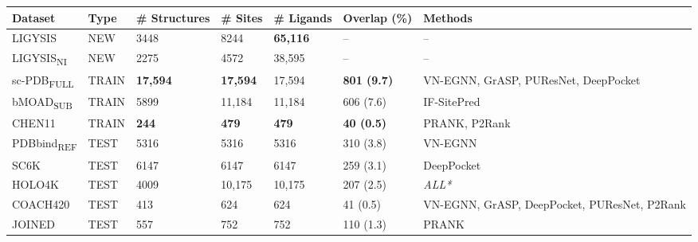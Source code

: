 \begin{landscape}
\begin{longtable}{|M{24mm}|M{20mm}|M{27mm}|M{20mm}|M{25mm}|M{25mm}|M{58mm}|}
\hline
\textbf{Dataset}    & \textbf{Type}  & \textbf{\# Structures} & \textbf{\# Sites} & \textbf{\# Ligands} & \textbf{Overlap} (\%) & \textbf{Methods}                                      \\ \hline
\endfirsthead
%
\endhead
%
LIGYSIS    & NEW   & 3448         & 8244    & \textbf{\textcolor{CBBlue}{65,116}}     & --          & --                                            \\ \hline
LIGYSIS\textsubscript{NI}  & NEW   & 2275         & 4572    & 38,595     & --          & --                                            \\ \hline
sc-PDB\textsubscript{FULL} & TRAIN & \textbf{\textcolor{CBBlue}{17,594}}        & \textbf{\textcolor{CBBlue}{17,594}}   & 17,594     & \textbf{\textcolor{CBOrange}{801 (9.7)}}        & VN-EGNN, GrASP, PUResNet, DeepPocket         \\ \hline
bMOAD\textsubscript{SUB}   & TRAIN & 5899         & 11,184   & 11,184     & 606 (7.6)        & IF-SitePred                                  \\ \hline
CHEN11     & TRAIN & \textbf{\textcolor{CBOrange}{244}}           & \textbf{\textcolor{CBOrange}{479}}      & \textbf{\textcolor{CBOrange}{479}}        & \textbf{\textcolor{CBBlue}{40 (0.5)}}        & PRANK, P2Rank                                       \\ \hline
PDBbind\textsubscript{REF} & TEST  & 5316         & 5316    & 5316      & 310 (3.8)        & VN-EGNN                                      \\ \hline
SC6K       & TEST  & 6147         & 6147    & 6147      & 259 (3.1)        & DeepPocket                                   \\ \hline
HOLO4K     & TEST  & 4009         & 10,175   & 10,175     & 207 (2.5)        & \textit{ALL*}                                         \\ \hline
COACH420   & TEST  & 413           & 624      & 624        & 41 (0.5)        & VN-EGNN, GrASP, DeepPocket, PUResNet, P2Rank \\ \hline
JOINED   & TEST  & 557           & 752      & 752        & 110 (1.3)        & PRANK \\ \hline

\end{longtable}
\end{landscape}
